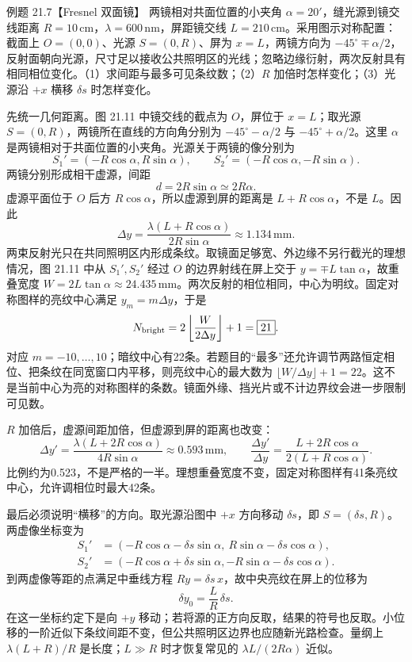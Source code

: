 \begin{origexamplebox}{例题 21.7【Fresnel 双面镜】}
两镜相对共面位置的小夹角 $\alpha=20'$，缝光源到镜交线距离 $R=10\,\mathrm{cm}$，$\lambda=600\,\mathrm{nm}$，屏距镜交线 $L=210\,\mathrm{cm}$。采用图示对称配置：截面上 $O=(0,0)$、光源 $S=(0,R)$、屏为 $x=L$，两镜方向为 $-45^\circ\mp\alpha/2$，反射面朝向光源，尺寸足以接收公共照明区的光线；忽略边缘衍射，两次反射具有相同相位变化。（1）求间距与最多可见条纹数；（2）$R$ 加倍时怎样变化；（3）光源沿 $+x$ 横移 $\delta s$ 时怎样变化。
\end{origexamplebox}
\begin{xesolution}
先统一几何距离。图 21.11 中镜交线的截点为 $O$，屏位于 $x=L$；取光源 $S=(0,R)$，两镜所在直线的方向角分别为 $-45^\circ-\alpha/2$ 与 $-45^\circ+\alpha/2$。这里 $\alpha$ 是两镜相对于共面位置的小夹角。光源关于两镜的像分别为
\[
 S_1'=(-R\cos\alpha,R\sin\alpha),\qquad
 S_2'=(-R\cos\alpha,-R\sin\alpha).
\]
两镜分别形成相干虚源，间距
\[
 d=2R\sin\alpha\simeq2R\alpha.
\]
虚源平面位于 $O$ 后方 $R\cos\alpha$，所以虚源到屏的距离是 $L+R\cos\alpha$，不是 $L$。因此
\[
 \boxed{\Delta y=\frac{\lambda(L+R\cos\alpha)}{2R\sin\alpha}
 \approx1.134\,\mathrm{mm}}.
\]
两束反射光只在共同照明区内形成条纹。取镜面足够宽、外边缘不另行截光的理想情况，图 21.11 中从 $S_1',S_2'$ 经过 $O$ 的边界射线在屏上交于 $y=\mp L\tan\alpha$，故重叠宽度 $W=2L\tan\alpha\approx24.435\,\mathrm{mm}$。两次反射的相位相同，中心为明纹。固定对称图样的亮纹中心满足 $y_m=m\Delta y$，于是
\[
 N_{\rm bright}=2\left\lfloor\frac W{2\Delta y}\right\rfloor+1
 =\boxed{21}.
\]
对应 $m=-10,\ldots,10$；暗纹中心有22条。若题目的“最多”还允许调节两路恒定相位、把条纹在同宽窗口内平移，则亮纹中心的最大数为 $\lfloor W/\Delta y\rfloor+1=22$。这不是当前中心为亮的对称图样的条数。镜面外缘、挡光片或不计边界纹会进一步限制可见数。

$R$ 加倍后，虚源间距加倍，但虚源到屏的距离也改变：
\[
 \Delta y'=\frac{\lambda(L+2R\cos\alpha)}{4R\sin\alpha}
 \approx0.593\,\mathrm{mm},\qquad
 \frac{\Delta y'}{\Delta y}=\frac{L+2R\cos\alpha}{2(L+R\cos\alpha)}.
\]
比例约为0.523，不是严格的一半。理想重叠宽度不变，固定对称图样有41条亮纹中心，允许调相位时最大42条。

最后必须说明“横移”的方向。取光源沿图中 $+x$ 方向移动 $\delta s$，即 $S=(\delta s,R)$。两虚像坐标变为
\[
 \begin{split}
 S_1'&=(-R\cos\alpha-\delta s\sin\alpha,\ R\sin\alpha-\delta s\cos\alpha),\\
 S_2'&=(-R\cos\alpha+\delta s\sin\alpha,-R\sin\alpha-\delta s\cos\alpha).
 \end{split}
\]
到两虚像等距的点满足中垂线方程 $Ry=\delta s\,x$，故中央亮纹在屏上的位移为
\[
 \boxed{\delta y_0=\frac LR\,\delta s}.
\]
在这一坐标约定下是向 $+y$ 移动；若将源的正方向反取，结果的符号也反取。小位移的一阶近似下条纹间距不变，但公共照明区边界也应随新光路检查。量纲上 $\lambda(L+R)/R$ 是长度；$L\gg R$ 时才恢复常见的 $\lambda L/(2R\alpha)$ 近似。
\end{xesolution}


